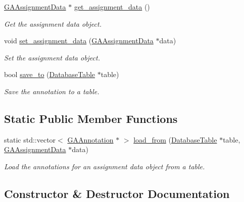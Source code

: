 \begin{DoxyCompactItemize}
\hyperlink{class_g_a_assignment_data}{G\+A\+Assignment\+Data} $\ast$ \hyperlink{class_g_a_annotation_aa99df6e807758f57b0ed5c836ec43f0e}{get\+\_\+assignment\+\_\+data} ()
\begin{DoxyCompactList}\small\item\em Get the assignment data object. \end{DoxyCompactList}\item 
void \hyperlink{class_g_a_annotation_a6dfc89a54027eefa6d3f7928faf22593}{set\+\_\+assignment\+\_\+data} (\hyperlink{class_g_a_assignment_data}{G\+A\+Assignment\+Data} $\ast$data)
\begin{DoxyCompactList}\small\item\em Set the assignment data object. \end{DoxyCompactList}\item 
bool \hyperlink{class_g_a_annotation_ad836d6b85aa860864ccc2e8afefd78cd}{save\+\_\+to} (\hyperlink{class_database_table}{Database\+Table} $\ast$table)
\begin{DoxyCompactList}\small\item\em Save the annotation to a table. \end{DoxyCompactList}\end{DoxyCompactItemize}
\subsection*{Static Public Member Functions}
\begin{DoxyCompactItemize}
\item 
static std\+::vector$<$ \hyperlink{class_g_a_annotation}{G\+A\+Annotation} $\ast$ $>$ \hyperlink{class_g_a_annotation_acbf5c9a4f95f75d7a7cf7cc6f43e00b5}{load\+\_\+from} (\hyperlink{class_database_table}{Database\+Table} $\ast$table, \hyperlink{class_g_a_assignment_data}{G\+A\+Assignment\+Data} $\ast$data)
\begin{DoxyCompactList}\small\item\em Load the annotations for an assignment data object from a table. \end{DoxyCompactList}\end{DoxyCompactItemize}


\subsection{Constructor \& Destructor Documentation}
\mbox{\label{class_g_a_annotation_a71e9337bdd11b745c244cb4daa370cf6}} 
